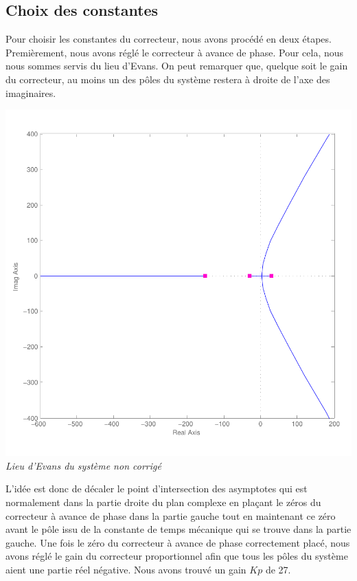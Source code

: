 \documentclass[11pt, french]{article} %
\begin{document}
\subsection{Choix des constantes}

Pour choisir les constantes du correcteur, nous avons procédé en deux étapes. Premièrement, nous avons réglé le correcteur à avance de phase. Pour cela, nous nous sommes servis du lieu d'Evans. On peut remarquer que, quelque soit le gain du correcteur, au moins un des pôles du système restera à droite de l'axe des imaginaires.

\begin{center}
\includegraphics [scale=0.50]{RL_Sys_Seul.pdf}\\
\vspace{-10pt}
\emph{Lieu d'Evans du système non corrigé}
\end{center}

L'idée est donc de décaler le point d'intersection des asymptotes qui est normalement dans la partie droite du plan complexe en plaçant le zéros du correcteur à avance de phase dans la partie gauche tout en maintenant ce zéro avant le pôle issu de la constante de temps mécanique qui se trouve dans la partie gauche. Une fois le zéro du correcteur à avance de phase correctement placé, nous avons réglé le gain du correcteur proportionnel afin que tous les pôles du système aient une partie réel négative. Nous avons trouvé un gain $Kp$ de 27. 
\end{document}
